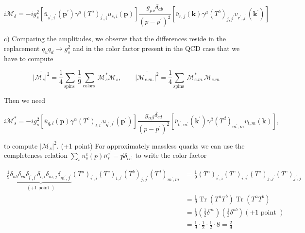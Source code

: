 \documentclass[10pt, letterpaper]{article}
\begin{document}
$$
i \mathcal{M}_\delta=-i g_s^2\left[\bar{u}_{s^{\prime}, i^{\prime}}\left(\mathbf{p}^{\prime}\right) \gamma^\mu\left(T^a\right)_{i^{\prime}, i} u_{s, i}(\mathbf{p})\right] \frac{g_{\mu \nu} \delta_{a b}}{\left(p-p^{\prime}\right)^2}\left[\bar{v}_{r, j}(\mathbf{k}) \gamma^\mu\left(T^b\right)_{j, j^{\prime}} v_{r^{\prime}, j^{\prime}}\left(\mathbf{k}^{\prime}\right)\right]
$$

c) Comparing the amplitudes, we observe that the differences reside in the replacement $q_u q_d \rightarrow g_s^2$ and in the color factor present in the QCD case that we have to compute

$$
\overline{\left|\mathcal{M}_s\right|^2}=\frac{1}{4} \sum_{\text {spins }} \frac{1}{9} \sum_{\text {colors }} \mathcal{M}_s^* \mathcal{M}_s, \quad \quad \overline{\left|\mathcal{M}_{e . m .}\right|^2}=\frac{1}{4} \sum_{\text {spins }} \mathcal{M}_{e . m .}^* \mathcal{M}_{e . m}
$$


Then we need

$$
i \mathcal{M}_s^*=-i g_s^2\left[\bar{u}_{q, l}(\mathbf{p}) \gamma^\alpha\left(T^c\right)_{l, l^{\prime}} u_{q^{\prime}, l^{\prime}}\left(\mathbf{p}^{\prime}\right)\right] \frac{g_{\alpha \beta} \delta_{c d}}{\left(p-p^{\prime}\right)^2}\left[\bar{v}_{t^{\prime}, m^{\prime}}\left(\mathbf{k}^{\prime}\right) \gamma^\beta\left(T^d\right)_{m^{\prime}, m} v_{t, m}(\mathbf{k})\right],
$$

to compute $\left|\mathcal{M}_s\right|^2$. (+1 point) For approximately massless quarks we can use the completeness relation $\sum_s u_s^c(p) \bar{u}_s^{c^{\prime}}=\not p \delta_{c c^{\prime}}$ to write the color factor

$$
\begin{aligned}
\frac{1}{9} \underbrace{\delta_{a b} \delta_{c d} \delta_{l^{\prime}, i^{\prime}} \delta_{l, i} \delta_{m, j} \delta_{m^{\prime}, j^{\prime}}}_{(+1 \text { point })}\left(T^a\right)_{i^{\prime}, i}\left(T^c\right)_{l, l^{\prime}}\left(T^b\right)_{j, j^{\prime}}\left(T^d\right)_{m^{\prime}, m} & =\frac{1}{9}\left(T^a\right)_{i^{\prime}, i}\left(T^c\right)_{i, i^{\prime}}\left(T^a\right)_{j, j^{\prime}}\left(T^c\right)_{j^{\prime}, j} \\
& =\frac{1}{9} \operatorname{Tr}\left(T^a T^b\right) \operatorname{Tr}\left(T^a T^b\right) \\
& =\frac{1}{9}\left(\frac{1}{2} \delta^{a b}\right)\left(\frac{1}{2} \delta^{a b}\right)(+1 \text { point }) \\
& =\frac{1}{9} \cdot \frac{1}{2} \cdot \frac{1}{2} \cdot 8=\frac{2}{9}
\end{aligned}
$$
\end{document}
